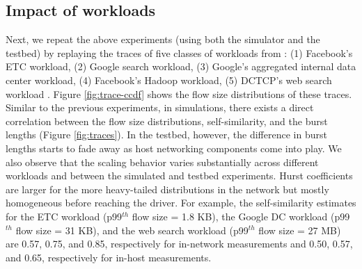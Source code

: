 \subsection{Impact of workloads}
Next, we repeat the above experiments (using both the simulator and the testbed) by replaying the  traces of five classes of workloads from \cite{homa}: (1) Facebook's ETC workload,  (2) Google search workload, (3) Google's aggregated internal data center workload, (4) Facebook's Hadoop workload, (5) DCTCP's web search workload \cite{dctcp}.
Figure \ref{fig:trace-ccdf} shows the flow size distributions of these traces. 
Similar to the previous experiments, in simulations, there exists a direct correlation between the flow size distributions, self-similarity, and the burst lengths (Figure \ref{fig:traces}). In the testbed, however, the difference in burst lengths starts to fade away as host networking components come into play.
%
We also observe that the scaling behavior varies substantially across different workloads and between the simulated and testbed experiments.
Hurst coefficients are larger for the more heavy-tailed distributions in the network but mostly homogeneous before reaching the driver.
For example, the self-similarity estimates for the ETC workload (p99$^{th}$ flow size = 1.8 KB), the Google DC workload (p99$^{th}$ flow size = 31 KB), and the web search workload (p99$^{th}$ flow size = 27 MB) are 0.57, 0.75, and 0.85, respectively for in-network measurements and 0.50, 0.57, and 0.65, respectively for in-host measurements.

